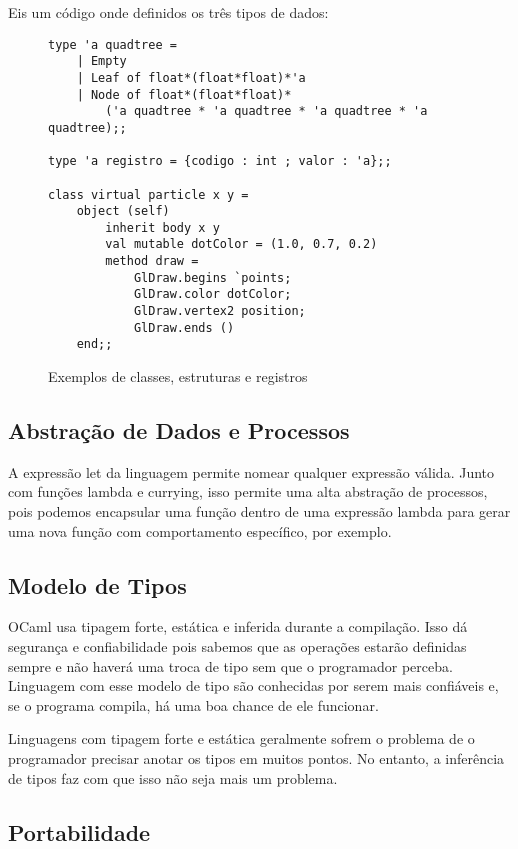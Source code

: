 \documentclass[a4paper,10pt]{article}
\begin{document}
		Eis um código onde definidos os três tipos de dados:
		
		\begin{figure}[H]
	\begin{lstlisting}
type 'a quadtree =
	| Empty
	| Leaf of float*(float*float)*'a
	| Node of float*(float*float)*
		('a quadtree * 'a quadtree * 'a quadtree * 'a quadtree);;

type 'a registro = {codigo : int ; valor : 'a};;
	
class virtual particle x y =
	object (self)
		inherit body x y
		val mutable dotColor = (1.0, 0.7, 0.2)
		method draw =
			GlDraw.begins `points;
			GlDraw.color dotColor;
			GlDraw.vertex2 position;
			GlDraw.ends ()
	end;;

	\end{lstlisting}
		\caption{Exemplos de classes, estruturas e registros}
		\end{figure}
		
	\subsection{Abstração de Dados e Processos}
		A expressão let da linguagem permite nomear qualquer expressão válida. Junto com funções lambda e currying, isso permite uma alta abstração de processos, pois podemos encapsular uma função dentro de uma expressão lambda para gerar uma nova função com comportamento específico, por exemplo.
		
	\subsection{Modelo de Tipos}
		
		OCaml usa tipagem forte, estática e inferida durante a compilação. Isso dá segurança e confiabilidade pois sabemos que as operações estarão definidas sempre e não haverá uma troca de tipo sem que o programador perceba. Linguagem com esse modelo de tipo são conhecidas por serem mais confiáveis e, se o programa compila, há uma boa chance de ele funcionar.
		
		Linguagens com tipagem forte e estática geralmente sofrem o problema de o programador precisar anotar os tipos em muitos pontos. No entanto, a inferência de tipos faz com que isso não seja mais um problema.
		
	\subsection{Portabilidade}
		
\end{document}
